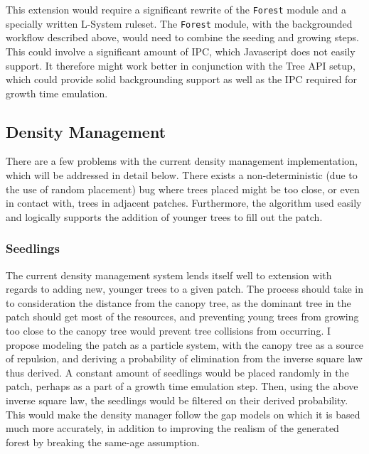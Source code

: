 \documentclass{article}
\newcommand{\tab}{\hspace*{2em}}
\begin{document}
    \tab This extension would require a significant rewrite of the \verb|Forest| module and a
specially written L-System ruleset. The \verb|Forest| module, with the backgrounded workflow
described above, would need to combine the seeding and growing steps. This could involve a
significant amount of IPC, which Javascript does not easily support. It therefore might work better
in conjunction with the Tree API setup, which could provide solid backgrounding support as well as
the IPC required for growth time emulation.

        \subsection{Density Management}
    \tab There are a few problems with the current density management implementation, which will be
addressed in detail below. There exists a non-deterministic (due to the use of random placement)
bug where trees placed might be too close, or even in contact with, trees in adjacent patches.
Furthermore, the algorithm used easily and logically supports the addition of younger trees to fill
out the patch.

            \subsubsection{Seedlings}
    \tab The current density management system lends itself well to extension with regards to
adding new, younger trees to a given patch. The process should take in to consideration the
distance from the canopy tree, as the dominant tree in the patch should get most of the resources,
and preventing young trees from growing too close to the canopy tree would prevent tree collisions
from occurring. I propose modeling the patch as a particle system, with the canopy tree as a source
of repulsion, and deriving a probability of elimination from the inverse square law thus derived.
A constant amount of seedlings would be placed randomly in the patch, perhaps as a part of a growth
time emulation step. Then, using the above inverse square law, the seedlings would be filtered on
their derived probability. This would make the density manager follow the gap models on which it is
based much more accurately, in addition to improving the realism of the generated forest by
breaking the same-age assumption.
\end{document}
